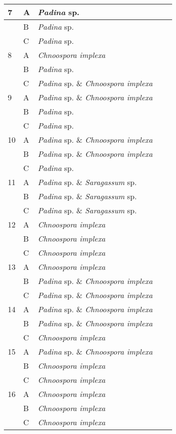 \documentclass[12pt]{article}
\begin{document}
\begin{longtable}{ | p{1cm} | p{1cm} | p{3cm} | p{4cm} | p{4cm} | }
\hline
7&A&\emph{Padina} sp.&&\\
\hline
&B&\emph{Padina} sp.&&\\
\hline
&C&\emph{Padina} sp.&&\\
\hline
8&A&\emph{Chnoospora implexa}&&\\
\hline
&B&\emph{Padina} sp.&&\\
\hline
&C&\emph{Padina} sp. \& \emph{Chnoospora implexa}&&\\
\hline
9&A&\emph{Padina} sp. \& \emph{Chnoospora implexa}&&\\
\hline
&B&\emph{Padina} sp.&&\\
\hline
&C&\emph{Padina} sp.&&\\
\hline
10&A&\emph{Padina} sp. \& \emph{Chnoospora implexa}&&\\
\hline
&B&\emph{Padina} sp. \& \emph{Chnoospora implexa}&&\\
\hline
&C&\emph{Padina} sp.&&\\
\hline
11&A&\emph{Padina} sp. \& \emph{Saragassum} sp.&&\\
\hline
&B&\emph{Padina} sp. \& \emph{Saragassum} sp.&&\\
\hline
&C&\emph{Padina} sp. \& \emph{Saragassum} sp.&&\\
\hline
12&A&\emph{Chnoospora implexa}&&\\
\hline
&B&\emph{Chnoospora implexa}&&\\
\hline
&C&\emph{Chnoospora implexa}&&\\
\hline
13&A&\emph{Chnoospora implexa}&&\\
\hline
&B&\emph{Padina} sp. \& \emph{Chnoospora implexa}&&\\
\hline
&C&\emph{Padina} sp. \& \emph{Chnoospora implexa}&&\\
\hline
14&A&\emph{Padina} sp. \& \emph{Chnoospora implexa}&&\\
\hline
&B&\emph{Padina} sp. \& \emph{Chnoospora implexa}&&\\
\hline
&C&\emph{Chnoospora implexa}&&\\
\hline
15&A&\emph{Padina} sp. \& \emph{Chnoospora implexa}&&\\
\hline
&B&\emph{Chnoospora implexa}&&\\
\hline
&C&\emph{Chnoospora implexa}&&\\
\hline
16&A&\emph{Chnoospora implexa}&&\\
\hline
&B&\emph{Chnoospora implexa}&&\\
\hline
&C&\emph{Chnoospora implexa}&&\\

\end{longtable}
\end{document}
